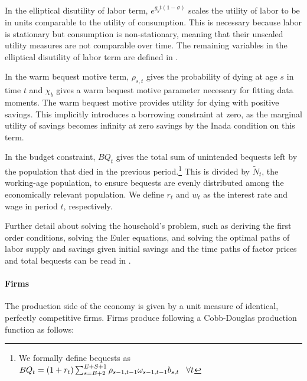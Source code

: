 \documentclass[10pt]{article}
\numberwithin{equation}{subsection}
\begin{document}
\begin{appendices}
\par In the elliptical disutility of labor term, \(e^{g_yt(1-\sigma)}\) scales the utility of labor to be in units comparable to the utility of consumption. This is necessary because labor is stationary but consumption is non-stationary, meaning that their unscaled utility measures are not comparable over time. The remaining variables in the elliptical disutility of labor term are defined in \cite{DE2018}.

\par In the warm bequest motive term, \(\rho_{s,t}\) gives the probability of dying at age \(s\) in time \(t\) and \(\chi_b\) gives a warm bequest motive parameter necessary for fitting data moments. The warm bequest motive provides utility for dying with positive savings. This implicitly introduces a borrowing constraint at zero, as the marginal utility of savings becomes infinity at zero savings by the Inada condition on this term.

\par In the budget constraint, \(BQ_t\) gives the total sum of unintended bequests left by the population that died in the previous period.\footnote{We formally define bequests as \(BQ_t = (1+r_t)\sum_{s=E+2}^{E+S+1}\rho_{s-1,t-1}\omega_{s-1,t-1}b_{s,t} \hspace{3mm} \forall t\)} This is divided by \(\tilde{N}_t\), the working-age population, to ensure bequests are evenly distributed among the economically relevant population. We define \(r_t\) and \(w_t\) as the interest rate and wage in period \(t\), respectively.

\par Further detail about solving the household's problem, such as deriving the first order conditions, solving the Euler equations, and solving the optimal paths of labor supply and savings given initial savings and the time paths of factor prices and total bequests can be read in \cite{E2020}.


\paragraph{Firms}

\par The production side of the economy is given by a unit measure of identical, perfectly competitive firms. Firms produce following a Cobb-Douglas production function as follows:


\end{appendices}
\end{document}
